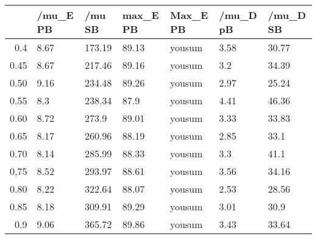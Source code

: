 \begin{table}[ht]
\centering
\begin{tabular}{rllllll}
  \hline
 & /mu\_E PB & /mu SB & max\_E PB & Max\_E PB & /mu\_D pB & /mu\_D SB \\ 
  \hline
0.4 & 8.67 & 173.19 & 89.13 & yousum & 3.58 & 30.77 \\ 
  0.45 & 8.67 & 217.46 & 89.16 & yousum & 3.2 & 34.39 \\ 
  0.50 & 9.16 & 234.48 & 89.26 & yousum & 2.97 & 25.24 \\ 
  0.55 & 8.3 & 238.34 & 87.9 & yousum & 4.41 & 46.36 \\ 
  0.60 & 8.72 & 273.9 & 89.01 & yousum & 3.33 & 33.83 \\ 
  0.65 & 8.17 & 260.96 & 88.19 & yousum & 2.85 & 33.1 \\ 
  0.70 & 8.14 & 285.99 & 88.33 & yousum & 3.3 & 41.1 \\ 
  0,75 & 8.52 & 293.97 & 88.61 & yousum & 3.56 & 34.16 \\ 
  0.80 & 8.22 & 322.64 & 88.07 & yousum & 2.53 & 28.56 \\ 
  0.85 & 8.18 & 309.91 & 89.29 & yousum & 3.01 & 30.9 \\ 
  0.9 & 9.06 & 365.72 & 89.86 & yousum & 3.43 & 33.64 \\ 
   \hline
\end{tabular}
\end{table}
